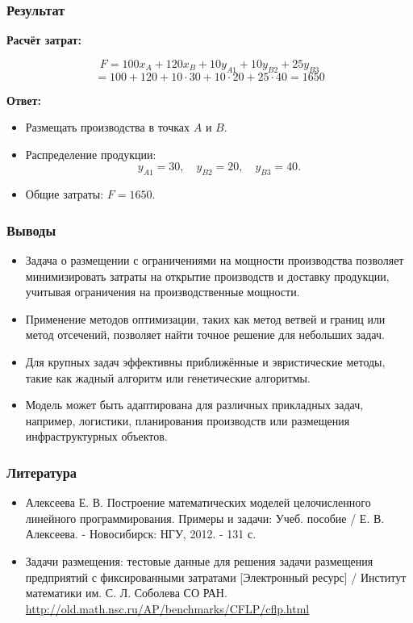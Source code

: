 \documentclass[12pt]{beamer}
\begin{document}
    \begin{frame}
        \frametitle{Результат}
    
        \textbf{Расчёт затрат:}

        $$F = 100x_A + 120x_B + 10y_{A1} + 10y_{B2} + 25y_{B3}$$
        $$= 100 + 120 + 10 \cdot 30 + 10 \cdot 20 + 25 \cdot 40 = 1650$$

        \textbf{Ответ:}
        \begin{itemize}
            \item Размещать производства в точках \( A \) и \( B \).
            \item Распределение продукции:
            \[
            y_{A1} = 30, \quad y_{B2} = 20, \quad y_{B3} = 40.
            \]
            \item Общие затраты: \( F = 1650 \).
        \end{itemize}
    
    \end{frame}

    \begin{frame}
        \frametitle{Выводы}
    
        \begin{itemize}
            \item Задача о размещении с ограничениями на мощности производства позволяет минимизировать затраты на открытие производств и доставку продукции, учитывая ограничения на производственные мощности.
            \item Применение методов оптимизации, таких как метод ветвей и границ или метод отсечений, позволяет найти точное решение для небольших задач.
            \item Для крупных задач эффективны приближённые и эвристические методы, такие как жадный алгоритм или генетические алгоритмы.
            \item Модель может быть адаптирована для различных прикладных задач, например, логистики, планирования производств или размещения инфраструктурных объектов.
        \end{itemize}
    
    \end{frame}

    \begin{frame}
        \frametitle{Литература}

        \begin{itemize}
            \item Алексеева Е. В. Построение математических моделей целочисленного линейного программирования. Примеры и задачи: Учеб. пособие / Е. В. Алексеева. - Новосибирск: НГУ, 2012. - 131 с.
            \item Задачи размещения: тестовые данные для решения задачи размещения предприятий с фиксированными затратами [Электронный ресурс] / Институт математики им. С. Л. Соболева СО РАН. \url{http://old.math.nsc.ru/AP/benchmarks/CFLP/cflp.html}
        \end{itemize}

    \end{frame}
	
\end{document}
